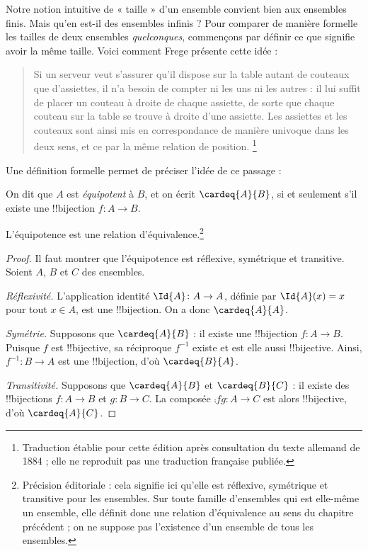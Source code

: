 \documentclass[../../../include/open-logic-section]{subfiles}
\begin{document}


Notre notion intuitive de « taille » d'un ensemble convient bien aux
ensembles finis. Mais qu'en est-il des ensembles infinis ? Pour
comparer de manière formelle les tailles de deux ensembles
\emph{quelconques}, commençons par définir ce que signifie avoir la
même taille. Voici comment Frege présente cette idée :
\begin{quote}
  Si un serveur veut s'assurer qu'il dispose sur la table autant de
  couteaux que d'assiettes, il n'a besoin de compter ni les uns ni les
  autres : il lui suffit de placer un couteau à droite de chaque
  assiette, de sorte que chaque couteau sur la table se trouve à droite
  d'une assiette. Les assiettes et les couteaux sont ainsi mis en
  correspondance de manière univoque dans les deux sens, et ce par la
  même relation de position. \citep[\S70]{Frege1884}\footnote{Traduction
  établie pour cette édition après consultation du texte allemand de
  1884 ; elle ne reproduit pas une traduction française publiée.}
\end{quote}
Une définition formelle permet de préciser l'idée de ce passage :

\begin{defn}
  On dit que $A$ est \emph{équipotent} à $B$, et on écrit
  $\cardeq{A}{B}$, si et seulement s'il existe une !!{bijection}
  $f \colon A \to B$.
\end{defn}

\begin{prop}
L'équipotence est une relation d'équivalence.\footnote{Précision
éditoriale : cela signifie ici qu'elle est réflexive, symétrique et
transitive pour les ensembles. Sur toute famille d'ensembles qui est
elle-même un ensemble, elle définit donc une relation d'équivalence
au sens du chapitre précédent ; on ne suppose pas l'existence d'un
ensemble de tous les ensembles.}
\end{prop}

\begin{proof}
Il faut montrer que l'équipotence est réflexive, symétrique et
transitive. Soient $A$, $B$ et $C$ des ensembles.

\emph{Réflexivité.} L'application identité $\Id{A} \colon A \to A$,
définie par $\Id{A}(x) = x$ pour tout $x \in A$, est une
!!{bijection}. On a donc $\cardeq{A}{A}$.

\emph{Symétrie.} Supposons que $\cardeq{A}{B}$ : il existe une
!!{bijection} $f\colon A \to B$. Puisque $f$ est !!{bijective},
sa réciproque $f^{-1}$ existe et est elle aussi !!{bijective}.
Ainsi, $f^{-1}\colon B \to A$ est une !!{bijection}, d'où
$\cardeq{B}{A}$.

\emph{Transitivité.} Supposons que $\cardeq{A}{B}$ et
$\cardeq{B}{C}$ : il existe des !!{bijection}s $f\colon A \to B$
et $g\colon B \to C$. La composée $\comp{f}{g}\colon A \to C$
est alors !!{bijective}, d'où $\cardeq{A}{C}$.
\end{proof}
\end{document}
